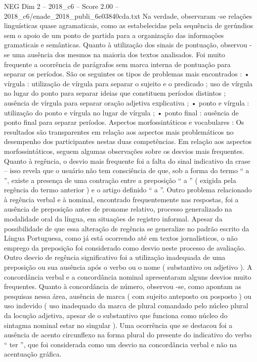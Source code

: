 \begin{textsample}{NEG Dim 2 – 2018\_c6 – Score 2.00 – 2018\_c6/enade\_2018\_publi\_6e03840cda.txt}
Na verdade, observaram -se relações linguísticas quase agramaticais, como as estabelecidas pela sequência de gerúndios sem o apoio de um ponto de partida para a organização das informações gramaticais e semânticas.
Quanto à utilização dos sinais de pontuação, observou -se uma ausência dos mesmos na maioria dos textos analisados.
Foi muito frequente a ocorrência de parágrafos sem marca interna de pontuação para separar os períodos.
São os seguintes os tipos de problemas mais encontrados : • vírgula : utilização de vírgula para separar o sujeito e o predicado ; uso de vírgula no lugar do ponto para separar ideias que constituem períodos distintos ; ausência de vírgula para separar oração adjetiva explicativa ; • ponto e vírgula : utilização do ponto e vírgula no lugar de vírgula ; • ponto final : ausência de ponto final para separar períodos.
Aspectos morfossintáticos e vocabulares : Os resultados são transparentes em relação aos aspectos mais problemáticos no desempenho dos participantes nestas duas competências.
Em relação aos aspectos morfossintáticos, seguem algumas observações sobre os desvios mais frequentes.
Quanto à regência, o desvio mais frequente foi a falta do sinal indicativo da crase – isso revela que o usuário não tem consciência de que, sob a forma do termo “ a ”, existe a presença de uma contração entre a preposição “ a ” ( exigida pela regência do termo anterior ) e o artigo definido “ a ”.
Outro problema relacionado à regência verbal e à nominal, encontrado frequentemente nas respostas, foi a ausência de preposição antes de pronome relativo, processo generalizado na modalidade oral da língua, em situações de registro informal.
Apesar da possibilidade de que essa alteração de regência se generalize no padrão escrito da Língua Portuguesa, como já está ocorrendo até em textos jornalísticos, o não emprego da preposição foi considerado como desvio neste processo de avaliação.
Outro desvio de regência significativo foi a utilização inadequada de uma preposição ou sua ausência após o verbo ou o nome ( substantivo ou adjetivo ).
A concordância verbal e a concordância nominal apresentaram alguns desvios muito frequentes.
Quanto à concordância de número, observou -se, como apontam as pesquisas nessa área, ausência de marca ( com sujeito anteposto ou posposto ) ou uso indevido ( uso inadequado da marca de plural comandado pelo núcleo plural da locução adjetiva, apesar de o substantivo que funciona como núcleo do sintagma nominal estar no singular ).
Uma ocorrência que se destacou foi a ausência de acento circunflexo na forma plural do presente do indicativo do verbo “ ter ”, que foi considerada como um desvio na concordância verbal e não na acentuação gráfica.

\end{textsample}
